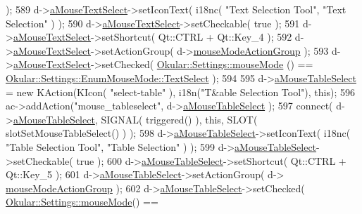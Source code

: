 \begin{DoxyCode}
       );
589     d->\hyperlink{classPageViewPrivate_a1d8b1716abeb281e68dce858ffda489f}{aMouseTextSelect}->setIconText( i18nc( \textcolor{stringliteral}{"Text Selection Tool"}, \textcolor{stringliteral}{"Text Selection"} ) );
590     d->\hyperlink{classPageViewPrivate_a1d8b1716abeb281e68dce858ffda489f}{aMouseTextSelect}->setCheckable( \textcolor{keyword}{true} );
591     d->\hyperlink{classPageViewPrivate_a1d8b1716abeb281e68dce858ffda489f}{aMouseTextSelect}->setShortcut( Qt::CTRL + Qt::Key\_4 );
592     d->\hyperlink{classPageViewPrivate_a1d8b1716abeb281e68dce858ffda489f}{aMouseTextSelect}->setActionGroup( d->\hyperlink{classPageViewPrivate_ae7b75854286f78f9b871f99bebb1eb73}{mouseModeActionGroup} );
593     d->\hyperlink{classPageViewPrivate_a1d8b1716abeb281e68dce858ffda489f}{aMouseTextSelect}->setChecked( \hyperlink{classOkular_1_1Settings_af8e39e25e841b413d67af2cb4dfc0688}{Okular::Settings::mouseMode}
      () == \hyperlink{classOkular_1_1Settings_1_1EnumMouseMode_ab2ae04e2d7d069f02195ccf32c52415bafafb47a3dab02c4016246ee80090e2d9}{Okular::Settings::EnumMouseMode::TextSelect} );
594 
595     d->\hyperlink{classPageViewPrivate_a6b679535b8feee220664963bcb7b0b56}{aMouseTableSelect}  = \textcolor{keyword}{new} KAction(KIcon( \textcolor{stringliteral}{"select-table"} ), i18n(\textcolor{stringliteral}{"T&able Selection
       Tool"}), \textcolor{keyword}{this});
596     ac->addAction(\textcolor{stringliteral}{"mouse\_tableselect"}, d->\hyperlink{classPageViewPrivate_a6b679535b8feee220664963bcb7b0b56}{aMouseTableSelect} );
597     connect( d->\hyperlink{classPageViewPrivate_a6b679535b8feee220664963bcb7b0b56}{aMouseTableSelect}, SIGNAL( triggered() ), \textcolor{keyword}{this}, SLOT( 
      slotSetMouseTableSelect() ) );
598     d->\hyperlink{classPageViewPrivate_a6b679535b8feee220664963bcb7b0b56}{aMouseTableSelect}->setIconText( i18nc( \textcolor{stringliteral}{"Table Selection Tool"}, \textcolor{stringliteral}{"Table Selection"} ) 
      );
599     d->\hyperlink{classPageViewPrivate_a6b679535b8feee220664963bcb7b0b56}{aMouseTableSelect}->setCheckable( \textcolor{keyword}{true} );
600     d->\hyperlink{classPageViewPrivate_a6b679535b8feee220664963bcb7b0b56}{aMouseTableSelect}->setShortcut( Qt::CTRL + Qt::Key\_5 );
601     d->\hyperlink{classPageViewPrivate_a6b679535b8feee220664963bcb7b0b56}{aMouseTableSelect}->setActionGroup( d->
      \hyperlink{classPageViewPrivate_ae7b75854286f78f9b871f99bebb1eb73}{mouseModeActionGroup} );
602     d->\hyperlink{classPageViewPrivate_a6b679535b8feee220664963bcb7b0b56}{aMouseTableSelect}->setChecked( 
      \hyperlink{classOkular_1_1Settings_af8e39e25e841b413d67af2cb4dfc0688}{Okular::Settings::mouseMode}() == 

\end{DoxyCode}
